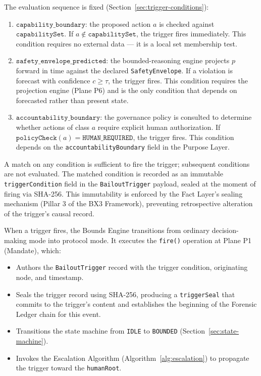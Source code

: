 The evaluation sequence is fixed (Section~\ref{sec:trigger-conditions}):

\begin{enumerate}
  \item[\textbf{C1}] $\texttt{capability\_boundary}$: the proposed action $a$ is checked against $\texttt{capabilitySet}$. If $a \notin \texttt{capabilitySet}$, the trigger fires immediately. This condition requires no external data --- it is a local set membership test.

  \item[\textbf{C2}] $\texttt{safety\_envelope\_predicted}$: the bounded-reasoning engine projects $p$ forward in time against the declared \texttt{SafetyEnvelope}. If a violation is forecast with confidence $c \geq \tau$, the trigger fires. This condition requires the projection engine (Plane P6) and is the only condition that depends on forecasted rather than present state.

  \item[\textbf{C3}] $\texttt{accountability\_boundary}$: the governance policy is consulted to determine whether actions of class $a$ require explicit human authorization. If $\texttt{policyCheck}(a) = \texttt{HUMAN\_REQUIRED}$, the trigger fires. This condition depends on the \texttt{accountabilityBoundary} field in the Purpose Layer.
\end{enumerate}

A match on any condition is sufficient to fire the trigger; subsequent conditions are not evaluated. The matched condition is recorded as an immutable \texttt{triggerCondition} field in the \texttt{BailoutTrigger} payload, sealed at the moment of firing via SHA-256. This immutability is enforced by the Fact Layer's sealing mechanism (Pillar 3 of the BX3 Framework), preventing retrospective alteration of the trigger's causal record.

When a trigger fires, the Bounds Engine transitions from ordinary decision-making mode into protocol mode. It executes the \texttt{fire()} operation at Plane P1 (Mandate), which:

\begin{itemize}
  \item Authors the \texttt{BailoutTrigger} record with the trigger condition, originating node, and timestamp.
  \item Seals the trigger record using SHA-256, producing a \texttt{triggerSeal} that commits to the trigger's content and establishes the beginning of the Forensic Ledger chain for this event.
  \item Transitions the state machine from \texttt{IDLE} to \texttt{BOUNDED} (Section~\ref{sec:state-machine}).
  \item Invokes the Escalation Algorithm (Algorithm~\ref{alg:escalation}) to propagate the trigger toward the \texttt{humanRoot}.
\end{itemize}

